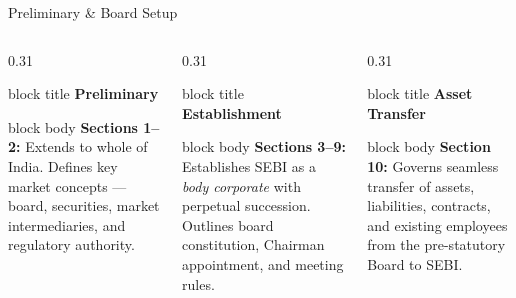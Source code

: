 \documentclass[aspectratio=169,10pt]{beamer}
\begin{document}
	\begin{frame}{Preliminary \& Board Setup}
		\vfill
		\begin{columns}[T]
			\begin{column}{0.31\textwidth}
				\begin{beamercolorbox}[rounded=true, sep=8pt]{block title}
					\centering\textbf{Preliminary}
				\end{beamercolorbox}
				\vspace{-2pt}
				\begin{beamercolorbox}[rounded=true, sep=10pt]{block body}
					\footnotesize \textbf{Sections 1--2:} Extends to whole of India. Defines key market concepts --- board, securities, market intermediaries, and regulatory authority.
				\end{beamercolorbox}
			\end{column}
			\begin{column}{0.31\textwidth}
				\begin{beamercolorbox}[rounded=true, sep=8pt]{block title}
					\centering\textbf{Establishment}
				\end{beamercolorbox}
				\vspace{-2pt}
				\begin{beamercolorbox}[rounded=true, sep=10pt]{block body}
					\footnotesize \textbf{Sections 3--9:} Establishes SEBI as a \textit{body corporate} with perpetual succession. Outlines board constitution, Chairman appointment, and meeting rules.
				\end{beamercolorbox}
			\end{column}
			\begin{column}{0.31\textwidth}
				\begin{beamercolorbox}[rounded=true, sep=8pt]{block title}
					\centering\textbf{Asset Transfer}
				\end{beamercolorbox}
				\vspace{-2pt}
				\begin{beamercolorbox}[rounded=true, sep=10pt]{block body}
					\footnotesize \textbf{Section 10:} Governs seamless transfer of assets, liabilities, contracts, and existing employees from the pre-statutory Board to SEBI.
				\end{beamercolorbox}
			\end{column}
		\end{columns}
		\vfill
	\end{frame}
	
\end{document}
